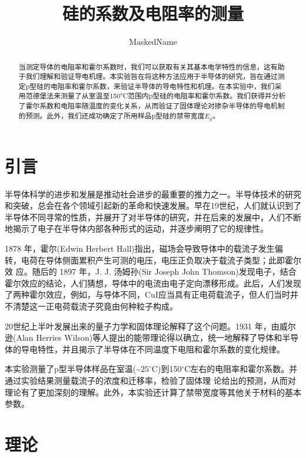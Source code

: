 \documentclass[font=default]{mpltx}
\begin{document}
\title{硅的系数及电阻率的测量} %
\author{MaskedName} %
\date{}
\begin{abstract}
当测定导体的电阻率和霍尔系数时，我们可以获取有关其基本电学特性的信息，这有助于我们理解和验证导电机理。本实验旨在将这种方法应用于半导体的研究，旨在通过测定p型硅的电阻率和霍尔系数，来验证半导体的导电特性和机理。在本实验中，我们采用范德堡法来测量了从室温至150°C范围内p型硅的电阻率和霍尔系数。我们获得并分析了霍尔系数和电阻率随温度的变化关系，从而验证了固体理论对掺杂半导体的导电机制的预测。此外，我们还成功确定了所用样品p型硅的禁带宽度$E_g$。
\end{abstract}

\maketitle

\section{引言}
半导体科学的进步和发展是推动社会进步的最重要的推力之一。半导体技术的研究和突破，总会在各个领域引起新的革命和快速发展。早在19世纪，人们就认识到了半导体不同寻常的性质，并展开了对半导体的研究，并在后来的发展中，人们不断地揭示了电子在半导体内部各种形式的运动，并逐步阐明了它的规律性。

1878 年，霍尔(Edwin Herbert Hall)指出，磁场会导致导体中的载流子发生偏
转，电荷在导体侧面累积产生可测的电压，电压正负取决于载流子类型；此即霍尔效
应。随后的 1897 年，J. J. 汤姆孙(Sir Joseph John Thomson)发现电子，结合霍尔效应的结论，人们猜想，导体中的电流由电子定向漂移形成。此后，人们发现了两种霍尔效应，例如，与导体不同，CuI应当具有正电荷载流子，但人们当时并不清楚这一正电荷载流子究竟由何种粒子构成。

20世纪上半叶发展出来的量子力学和固体理论解释了这个问题。1931 年，由威尔逊(Alan Herries Wilson)等人提出的能带理论得以确立，统一地解释了导体和半导体的导电特性，并且揭示了半导体在不同温度下电阻和霍尔系数的变化规律。

本实验测量了p型半导体样品在室温(\textasciitilde$25^\circ$C)到150$^\circ$C左右的电阻率和霍尔系数。并通过实验结果测量载流子的浓度和迁移率，检验了固体理
论给出的预测，从而对理论有了更加深刻的理解。此外，本实验还计算了禁带宽度等其他关于材料的基本参数。
\section{理论}
\end{document}
